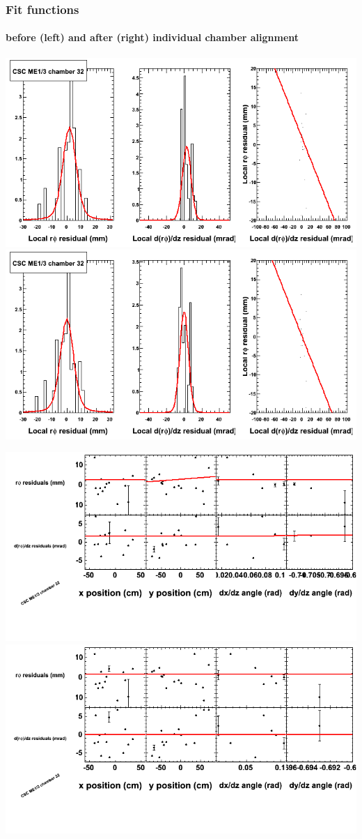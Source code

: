 \documentclass[compress]{beamer}
\begin{document}
\begin{frame}
\frametitle{Fit functions}
\framesubtitle{before (left) and after (right) individual chamber alignment}
\includegraphics[width=0.5\linewidth]{ringfits_3dof/beforefit_MEp13_32_bellcurve.png} \includegraphics[width=0.5\linewidth]{ringfits_3dof/afterfit_MEp13_32_bellcurve.png}

\includegraphics[width=0.5\linewidth]{ringfits_3dof/beforefit_MEp13_32_polynomials.png} \includegraphics[width=0.5\linewidth]{ringfits_3dof/afterfit_MEp13_32_polynomials.png}
\end{frame}
\end{document}
